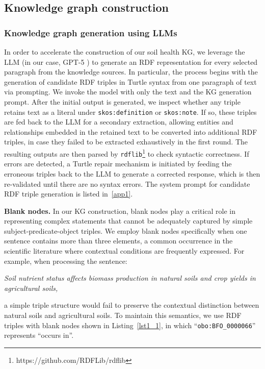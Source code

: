 \documentclass[preprint,12pt]{elsarticle}
\begin{document}
\subsection{Knowledge graph construction}\label{sec3_3}
\subsubsection{Knowledge graph generation using LLMs}
In order to accelerate the construction of our soil health KG, we leverage the LLM (in our case, GPT-5 \citep{2025openaigpt5card}) to generate an RDF representation for every selected paragraph from the knowledge sources. In particular, the process begins with the generation of candidate RDF triples in Turtle syntax from one paragraph of text via prompting. We invoke the model with only the text and the KG generation prompt. After the initial output is generated, we inspect whether any triple retains text as a literal under \texttt{skos:definition} or \texttt{skos:note}. If so, these triples are fed back to the LLM for a secondary extraction, allowing entities and relationships embedded in the retained text to be converted into additional RDF triples, in case they failed to be extracted exhaustively in the first round. The resulting outputs are then parsed by \texttt{rdflib}\footnote{https://github.com/RDFLib/rdflib} to check syntactic correctness. If errors are detected, a Turtle repair mechanism is initiated by feeding the erroneous triples back to the LLM to generate a corrected response, which is then re-validated until there are no syntax errors. The system prompt for candidate RDF triple generation is listed in~\ref{app1}.

\textbf{Blank nodes.} \label{sec3_3_1} In our KG construction, blank nodes play a critical role in representing complex statements that cannot be adequately captured by simple subject-predicate-object triples. We employ blank nodes specifically when one sentence contains more than three elements, a common occurrence in the scientific literature where contextual conditions are frequently expressed. For example, when processing the sentence:

\textit{Soil nutrient status affects biomass production in natural soils and crop yields in agricultural soils,}

\noindent a simple triple structure would fail to preserve the contextual distinction between natural soils and agricultural soils. To maintain this semantics, we use RDF triples with blank nodes shown in Listing~\ref{lst1_1}, in which ``\texttt{obo:BFO\_0000066}'' represents ``occurs in''.
\end{document}
